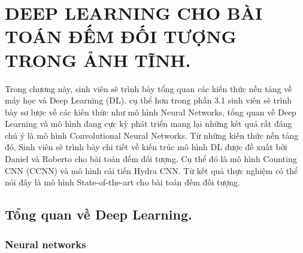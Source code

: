 
\chapter{DEEP LEARNING CHO BÀI TOÁN ĐẾM ĐỐI TƯỢNG TRONG ẢNH TĨNH.}
\ifpdf
    \graphicspath{{Chapter3/Chapter3Figs/PNG/}{Chapter3/Chapter3Figs/PDF/}{Chapter3/Chapter3Figs/}}
\else
    \graphicspath{{Chapter3/Chapter3Figs/EPS/}{Chapter3/Chapter3Figs/}}
\fi

Trong chương này, sinh viên sẽ trình bày tổng quan các kiến thức nền tảng về máy học và Deep Learning (DL). cụ thể hơn trong phần 3.1 sinh viên sẽ trình bày sơ lược về các kiến thức như mô hình Neural Networks, tổng quan về Deep Learning và mô hình đang cực kỳ phát triển mang lại những kết quả rất đáng chú ý là mô hình Convolutional Neural Networks. Từ những kiến thức nền tảng đó, Sinh viên sẽ trình bày chi tiết về kiến trúc mô hình DL được đề xuất bởi Daniel và Roberto \cite{onoro2016towards} cho bài toán đếm đối tượng. Cụ thể đó là mô hình Counting CNN (CCNN) và mô hình cải tiến Hydra CNN. Từ kết quả thực nghiệm có thể nói đây là mô hình State-of-the-art cho bài toán đếm đối tượng.
\section{Tổng quan về Deep Learning.}
	

\subsection{Neural networks}
